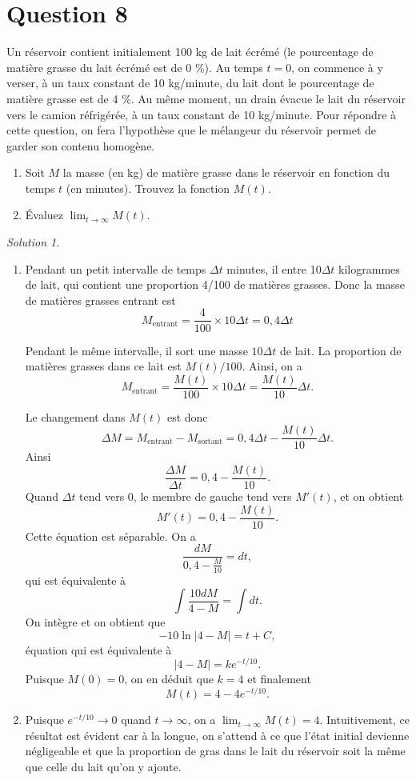 \documentclass[
  12pt,
  letterpaper,
]{book}
\providecommand{\tightlist}{%
  \setlength{\itemsep}{0pt}\setlength{\parskip}{0pt}}\usepackage{longtable,booktabs,array}
\theoremstyle{remark}
\newtheorem*{solution}{Solution}
\begin{document}
\hypertarget{question-8-2}{%
\section{Question 8}\label{question-8-2}}

Un réservoir contient initialement 100 kg de lait écrémé (le pourcentage
de matière grasse du lait écrémé est de 0 \%). Au temps \(t=0\), on
commence à y verser, à un taux constant de 10 kg/minute, du lait dont le
pourcentage de matière grasse est de 4 \%. Au même moment, un drain
évacue le lait du réservoir vers le camion réfrigérée, à un taux
constant de 10 kg/minute. Pour répondre à cette question, on fera
l'hypothèse que le mélangeur du réservoir permet de garder son contenu
homogène.

\begin{enumerate}
\tightlist
\item
  Soit \(M\) la masse (en kg) de matière grasse dans le réservoir en
  fonction du temps \(t\) (en minutes). Trouvez la fonction \(M(t)\).
\item
  Évaluez \(\lim_{t\rightarrow\infty}M(t)\).
\end{enumerate}

\begin{solution}

\begin{enumerate}
\item
  Pendant un petit intervalle de temps \(\Delta t\) minutes, il entre
  10\(\Delta t\) kilogrammes de lait, qui contient une proportion 4/100
  de matières grasses. Donc la masse de matières grasses entrant est
  \[M_{\text{entrant}} = \frac{4}{100} \times 10\Delta t = 0{,}4 \Delta t\]

  Pendant le même intervalle, il sort une masse \(10\Delta t\) de lait.
  La proportion de matières grasses dans ce lait est \(M(t)/100\).
  Ainsi, on a
  \[M_{\text{entrant}} = \frac{M(t)}{100} \times 10\Delta t = \frac{M(t)}{10} \Delta t.\]

  Le changement dans \(M(t)\) est donc
  \[\Delta M = M_{\text{entrant}} - M_{\text{sortant}} = 0{,}4 \Delta t - \frac{M(t)}{10} \Delta t.\]
  Ainsi \[\frac{\Delta M}{\Delta t} = 0{,}4 - \frac{M(t)}{10}.\] Quand
  \(\Delta t\) tend vers 0, le membre de gauche tend vers \(M'(t)\), et
  on obtient \[M'(t) = 0{,}4 - \frac{M(t)}{10}.\] Cette équation est
  séparable. On a \[\frac{dM}{0{,}4 - \frac{M}{10}} = dt,\] qui est
  équivalente à \[\int \frac{10dM}{4 - M} = \int dt.\] On intègre et on
  obtient que \[-10 \ln|4 - M| = t + C,\] équation qui est équivalente à
  \[|4 - M| = ke^{-t/10}.\] Puisque \(M(0) = 0\), on en déduit que
  \(k = 4\) et finalement \[M(t) = 4 - 4e^{-t/10}.\]
\item
  Puisque \(e^{-t/10} \to 0\) quand \(t \to \infty\), on a
  \(\lim_{t \to \infty} M(t) = 4\). Intuitivement, ce résultat est
  évident car à la longue, on s'attend à ce que l'état initial devienne
  négligeable et que la proportion de gras dans le lait du réservoir
  soit la même que celle du lait qu'on y ajoute.
\end{enumerate}

\end{solution}
\end{document}
